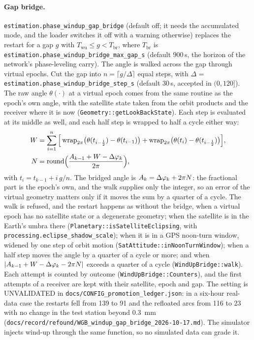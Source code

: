 \documentclass[main.tex]{subfiles}
\begin{document}
\paragraph{Gap bridge.}
\texttt{estimation.phase\_windup\_gap\_bridge} (default off; it needs the
accumulated mode, and the loader switches it off with a warning
otherwise) replaces the restart for a gap $g$ with
$T_{\mathrm{wu}}\le g<T_{\mathrm{br}}$, where $T_{\mathrm{br}}$ is
\texttt{estimation.phase\_windup\_bridge\_max\_gap\_s} (default
$900$\,s, the horizon of the network's phase-leveling carry).  The angle is
walked across the gap through virtual epochs.  Cut the gap into
$n=\lceil g/\Delta\rceil$ equal steps, with $\Delta$ =
\texttt{estimation.phase\_windup\_bridge\_step\_s} (default $30$\,s,
accepted in $(0,120]$).  The raw angle $\theta(\cdot)$ at a virtual epoch
comes from the same routine as the epoch's own angle, with the satellite
state taken from the orbit products and the receiver where it is now
(\texttt{Geometry::getLookBackState}).  Each step is evaluated at its
middle as well, and each half step is wrapped to half a cycle either way:
\begin{align}
W &= \sum_{i=1}^{n}\Big[\operatorname{wrap}_{2\pi}\!\big(\theta(t_{i-\frac12})-\theta(t_{i-1})\big)
 + \operatorname{wrap}_{2\pi}\!\big(\theta(t_{i})-\theta(t_{i-\frac12})\big)\Big],
\label{eq:obsphys-windup-walk}\\
N &= \operatorname{round}\!\Big(\frac{A_{k-1}+W-\Delta\varphi_k}{2\pi}\Big),
\label{eq:obsphys-windup-bridge}
\end{align}
with $t_i=t_{k-1}+i\,g/n$.  The bridged
angle is $A_k=\Delta\varphi_k+2\pi N$: the fractional part is the epoch's own,
and the walk supplies only the integer, so an error of the virtual
geometry matters only if it moves the sum by a quarter of a cycle.  The
walk is refused, and the restart happens as without the bridge, when a
virtual epoch has no satellite state or a degenerate geometry; when the
satellite is in the Earth's umbra there
(\texttt{Planetary::isSatelliteEclipsing}, with
\texttt{processing.eclipse\_shadow\_scale}); when it is in a GPS noon-turn
window, widened by one step of orbit motion
(\texttt{SatAttitude::inNoonTurnWindow}); when a half step moves the
angle by a quarter of a cycle or more; and when
$\lvert A_{k-1}+W-\Delta\varphi_k-2\pi N\rvert$ exceeds a quarter of a cycle
(\texttt{WindUpBridge::walk}).  Each attempt is counted by outcome
(\texttt{WindUpBridge::Counters}), and the first attempts of a receiver
are kept with their satellite, epoch and gap.  The setting is
UNVALIDATED in \texttt{docs/CONFIG\_promotion\_ledger.json}: in a six-hour real-data case
the restarts fell from 139 to 91 and the refloated arcs from 116 to 23
with no change in the test station beyond \SI{0.3}{\milli\metre}
(\texttt{docs/record/refound/WGB\_windup\_gap\_bridge\_2026-10-17.md}).  The
simulator injects wind-up through the same function, so no simulated data
can grade it.
\end{document}
